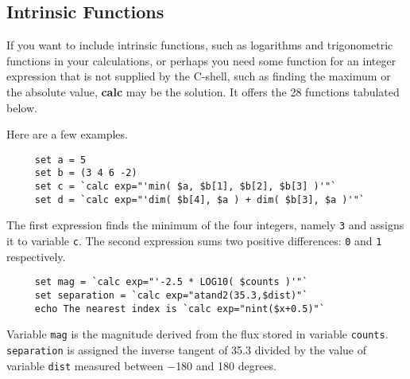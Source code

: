 \documentclass[twoside,11pt]{article}
\newcommand{\xref}[3]{#1}
\newcommand{\xlabel}[1]{}
\begin{document}
\subsection{\xlabel{sc4_se_intrinsic}Intrinsic Functions
\label{sc4_se_intrinsic}}

If you want to include intrinsic functions, such as logarithms and
trigonometric functions in your calculations, or perhaps you need some
function for an integer expression that is not supplied by the
C-shell, such as finding the maximum or the absolute value,
\xref{{\bf calc}}{sun95}{CALC} may be the solution.  It offers the
28 functions tabulated below.

Here are a few examples.

\small
\begin{verbatim}
     set a = 5
     set b = (3 4 6 -2)
     set c = `calc exp="'min( $a, $b[1], $b[2], $b[3] )'"`
     set d = `calc exp="'dim( $b[4], $a ) + dim( $b[3], $a )'"`
\end{verbatim}
\normalsize
The first expression finds the minimum of the four integers, namely
{\tt 3} and assigns it to variable {\tt c}.  The second expression
sums two positive differences: {\tt 0} and {\tt 1} respectively.

\small
\begin{verbatim}
     set mag = `calc exp="'-2.5 * LOG10( $counts )'"`
     set separation = `calc exp="atand2(35.3,$dist)"`
     echo The nearest index is `calc exp="nint($x+0.5)"`
\end{verbatim}
\normalsize
Variable {\tt mag} is the magnitude derived from the flux
stored in variable {\tt counts}.  {\tt separation} is assigned
the inverse tangent of 35.3 divided by the value of variable
{\tt dist} measured between $-$180 and 180 degrees. 

\bigskip
\end{document}
